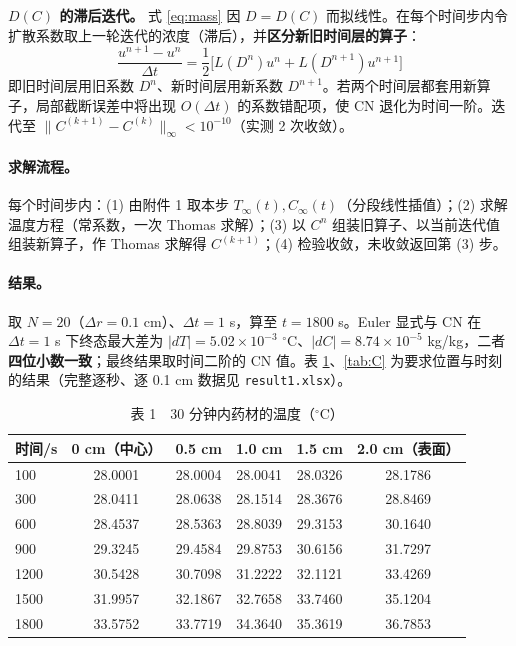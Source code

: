 \textbf{$D(C)$ 的滞后迭代。} 式 \eqref{eq:mass} 因 $D=D(C)$ 而拟线性。在每个时间步内令扩散系数取上一轮迭代的浓度（滞后），并\textbf{区分新旧时间层的算子}：
\begin{equation}
  \frac{u^{n+1}-u^{n}}{\Delta t}
  =\frac12\Big[L(D^n)u^{n}+L(D^{n+1})u^{n+1}\Big]
  \label{eq:cn_varc}
\end{equation}
即旧时间层用旧系数 $D^n$、新时间层用新系数 $D^{n+1}$。若两个时间层都套用新算子，局部截断误差中将出现 $O(\Delta t)$ 的系数错配项，使 CN 退化为时间一阶。迭代至 $\|C^{(k+1)}-C^{(k)}\|_\infty<10^{-10}$（实测 2 次收敛）。

\paragraph{求解流程。} 每个时间步内：(1) 由附件 1 取本步 $T_\infty(t),C_\infty(t)$（分段线性插值）；(2) 求解温度方程（常系数，一次 Thomas 求解）；(3) 以 $C^n$ 组装旧算子、以当前迭代值组装新算子，作 Thomas 求解得 $C^{(k+1)}$；(4) 检验收敛，未收敛返回第 (3) 步。

\paragraph{结果。} 取 $N=20$（$\Delta r=0.1$ cm）、$\Delta t=1$ s，算至 $t=1800$ s。Euler 显式与 CN 在 $\Delta t=1$ s 下终态最大差为 $|dT|=5.02\times10^{-3}$ $^\circ$C、$|dC|=8.74\times10^{-5}$ kg/kg，二者\textbf{四位小数一致}；最终结果取时间二阶的 CN 值。表 \ref{tab:T}、\ref{tab:C} 为要求位置与时刻的结果（完整逐秒、逐 0.1 cm 数据见 \texttt{result1.xlsx}）。

\begin{table}[H]
  \centering
  \caption{表 1　30 分钟内药材的温度（$^\circ$C）}
  \label{tab:T}
  \begin{tabular}{lccccc}
    \toprule
    时间/s & 0 cm（中心） & 0.5 cm & 1.0 cm & 1.5 cm & 2.0 cm（表面） \\
    \midrule
    100  & 28.0001 & 28.0004 & 28.0041 & 28.0326 & 28.1786 \\
    300  & 28.0411 & 28.0638 & 28.1514 & 28.3676 & 28.8469 \\
    600  & 28.4537 & 28.5363 & 28.8039 & 29.3153 & 30.1640 \\
    900  & 29.3245 & 29.4584 & 29.8753 & 30.6156 & 31.7297 \\
    1200 & 30.5428 & 30.7098 & 31.2222 & 32.1121 & 33.4269 \\
    1500 & 31.9957 & 32.1867 & 32.7658 & 33.7460 & 35.1204 \\
    1800 & 33.5752 & 33.7719 & 34.3640 & 35.3619 & 36.7853 \\
    \bottomrule
  \end{tabular}
\end{table}

